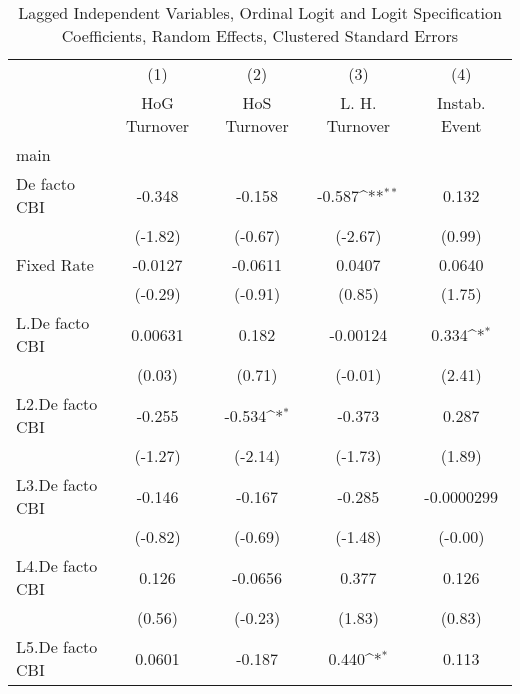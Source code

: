 {
\def\sym#1{\ifmmode^{#1}\else\(^{#1}\)\fi}
\begin{longtable}{l*{4}{c}}
\caption{Lagged Independent Variables, Ordinal Logit and Logit Specification Coefficients, Random Effects, Clustered Standard Errors \label{lagordLogLogDF}}\\
\hline\hline\endfirsthead\hline\endhead\hline\endfoot\endlastfoot
                &\multicolumn{1}{c}{(1)}&\multicolumn{1}{c}{(2)}&\multicolumn{1}{c}{(3)}&\multicolumn{1}{c}{(4)}\\
                &\multicolumn{1}{c}{HoG Turnover}&\multicolumn{1}{c}{HoS Turnover}&\multicolumn{1}{c}{L. H. Turnover}&\multicolumn{1}{c}{Instab. Event}\\
\hline
main            &                  &                  &                  &                  \\
De facto CBI    &   -0.348         &   -0.158         &   -0.587\sym{**} &    0.132         \\
                &  (-1.82)         &  (-0.67)         &  (-2.67)         &   (0.99)         \\
[1em]
Fixed Rate      &  -0.0127         &  -0.0611         &   0.0407         &   0.0640         \\
                &  (-0.29)         &  (-0.91)         &   (0.85)         &   (1.75)         \\
[1em]
L.De facto CBI  &  0.00631         &    0.182         & -0.00124         &    0.334\sym{*}  \\
                &   (0.03)         &   (0.71)         &  (-0.01)         &   (2.41)         \\
[1em]
L2.De facto CBI &   -0.255         &   -0.534\sym{*}  &   -0.373         &    0.287         \\
                &  (-1.27)         &  (-2.14)         &  (-1.73)         &   (1.89)         \\
[1em]
L3.De facto CBI &   -0.146         &   -0.167         &   -0.285         &-0.0000299         \\
                &  (-0.82)         &  (-0.69)         &  (-1.48)         &  (-0.00)         \\
[1em]
L4.De facto CBI &    0.126         &  -0.0656         &    0.377         &    0.126         \\
                &   (0.56)         &  (-0.23)         &   (1.83)         &   (0.83)         \\
[1em]
L5.De facto CBI &   0.0601         &   -0.187         &    0.440\sym{*}  &    0.113         \\

\end{longtable}}
